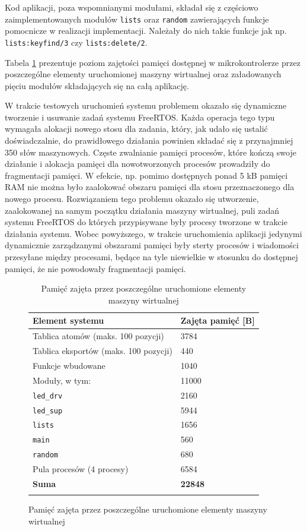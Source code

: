 Kod aplikacji, poza wspomnianymi modułami, składał się z częściowo zaimplementowanych modułów \texttt{lists} oraz \texttt{random} zawierających funkcje pomocnicze w realizacji implementacji.
Należały do nich takie funkcje jak np. \texttt{lists:keyfind/3} czy \texttt{lists:delete/2}.

Tabela \ref{table:ledMemory} prezentuje poziom zajętości pamięci dostępnej w mikrokontrolerze przez poszczególne elementy uruchomionej maszyny wirtualnej oraz załadowanych pięciu modułów składających się na całą aplikację.

W trakcie testowych uruchomień systemu problemem okazało się dynamiczne tworzenie i usuwanie zadań systemu FreeRTOS.
Każda operacja tego typu wymagała alokacji nowego stosu dla zadania, który, jak udało się ustalić doświadczalnie, do prawidłowego działania powinien składać się z przynajmniej 350 słów maszynowych.
Częste zwalnianie pamięci procesów, które kończą swoje działanie i alokacja pamięci dla nowotworzonych procesów prowadziły do fragmentacji pamięci. W efekcie, np. pomimo dostępnych ponad 5 kB pamięci RAM nie można było zaalokować obszaru pamięci dla stosu przeznaczonego dla nowego procesu.
Rozwiązaniem tego problemu okazało się utworzenie, zaalokowanej na samym początku działania maszyny wirtualnej, puli zadań systemu FreeRTOS do których przypisywane były procesy tworzone w trakcie działania systemu.
Wobec powyższego, w trakcie uruchomienia aplikacji jedynymi dynamicznie zarządzanymi obszarami pamięci były sterty procesów i wiadomości przesyłane między procesami, będące na tyle niewielkie w stosunku do dostępnej pamięci, że nie powodowały fragmentacji pamięci.

\begin{figure}[h]
\begin{longtable}{|l|l|}
\hline

\textbf{Element systemu} & \textbf{Zajęta pamięć [B]} \\
\endfirsthead
\hline
Tablica atomów (maks. 100 pozycji) & 3784 \\
\hline
Tablica eksportów (maks. 100 pozycji) & 440 \\
\hline
Funkcje wbudowane & 1040 \\
\hline
Moduły, w tym: & 11000 \\
{\small \texttt{led\_drv}} & {\small 2160} \\
{\small \texttt{led\_sup}} & {\small 5944} \\
{\small \texttt{lists}} & {\small 1656} \\
{\small \texttt{main}} & {\small 560} \\
{\small \texttt{random}} & {\small 680} \\
\hline
Pula procesów (4 procesy) & 6584 \\
\hline
\textbf{Suma} & \textbf{22848} \\
\hline

\caption{Pamięć zajęta przez poszczególne uruchomione elementy maszyny wirtualnej} 
\label{table:ledMemory} \\
\end{longtable}
\end{figure}

